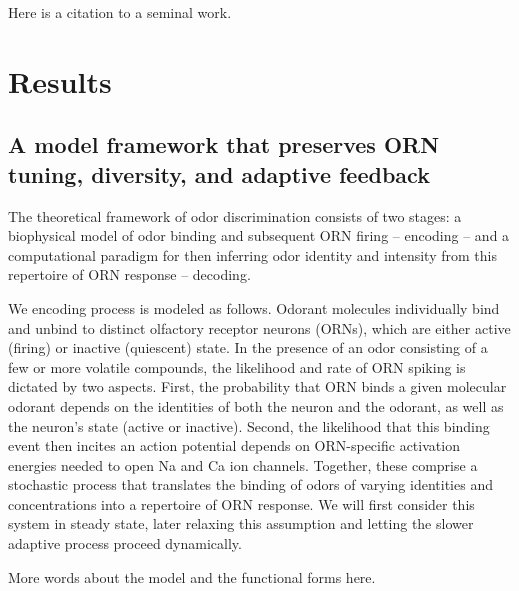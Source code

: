 
Here is a citation to a seminal work\cite{OKeeNade78a}. \lipsum[2-3]

\section*{Results}

\subsection*{A model framework that preserves ORN tuning, diversity, and adaptive feedback}

The theoretical framework of odor discrimination consists of two stages: a biophysical model of odor binding and subsequent ORN firing -- encoding -- and a computational paradigm for then inferring odor identity and intensity from this repertoire of ORN response -- decoding. 

We encoding process is modeled as follows. Odorant molecules individually bind and unbind to distinct olfactory receptor neurons (ORNs), which are either active (firing) or inactive (quiescent) state. In the presence of an odor consisting of a few or more volatile compounds, the likelihood and rate of ORN spiking is dictated by two aspects. First, the probability that ORN binds a given molecular odorant depends on the identities of both the neuron and the odorant, as well as the neuron's state (active or inactive). Second, the likelihood that this binding event then incites an action potential depends on ORN-specific activation energies needed to open Na and Ca ion channels. Together, these comprise a stochastic process that translates the binding of odors of varying identities and concentrations into a repertoire of ORN response. We will first consider this system in steady state, later relaxing this assumption and letting the slower adaptive process proceed dynamically. 


{\color {blue} More words about the model and the functional forms here.}

